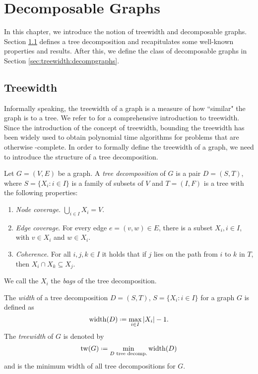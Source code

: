 \section{Decomposable Graphs}
\label{sec:treewidth}

In this chapter, we introduce the notion of treewidth and decomposable graphs. Section \ref{sec:treewidth:treewidth} defines a tree decomposition and recapitulates some well-known properties and results. After this, we define the class of decomposable graphs in Section \ref{sec:treewidth:decompgraphs}. 

\subsection{Treewidth}
\label{sec:treewidth:treewidth}

Informally speaking, the treewidth of a graph is a measure of how ``similar" the graph is to a tree. We refer to \cite{Bod96} for a comprehensive introduction to treewidth. Since the introduction of the concept of treewidth, bounding the treewidth has been widely used to obtain polynomial time algorithms for problems that are otherwise \NP-complete. In order to formally define the treewidth of a graph, we need to introduce the structure of a tree decomposition.

\begin{definition}
	\label{def:treedecomp}
	Let $G = (V,E)$ be a graph. A \textit{tree decomposition} of $G$ is a pair $D = (S, T)$, where $S = \{X_i : i \in I\}$ is a family of subsets of $V$ and $T = (I,F)$ is a tree with the following properties:
	\begin{enumerate}
		\item \textit{Node coverage}. $\bigcup_{i \in I} X_i = V$.
		\item \textit{Edge coverage}. For every edge $e = (v,w) \in E$, there is a subset $X_i, i \in I$, with $v	\in X_i$ and $w \in X_i$.
		\item \textit{Coherence}. For all $i, j, k \in I$ it holds that if $j$ lies on the path from $i$ to $k$ in $T$, then $X_i\cap X_k \subseteq X_j$.
	\end{enumerate}
	We call the $X_i$ the \textit{bags} of the tree decomposition.
\end{definition}

\begin{definition}[Treewidth]
	The \textit{width} of a tree decomposition $D = (S, T)$, $S = \{X_i : i \in I\}$ for a graph $G$ is defined as
	$$\mathrm{width} (D) \defeq \max_{i \in I} |X_i| - 1.$$
	The \textit{treewidth} of $G$ is denoted by 
	$$\mathrm{tw}(G) \defeq \min_{D\text{ tree decomp.}} \mathrm{width}(D)$$
	and is the minimum width of all tree decompositions for $G$.
\end{definition}

